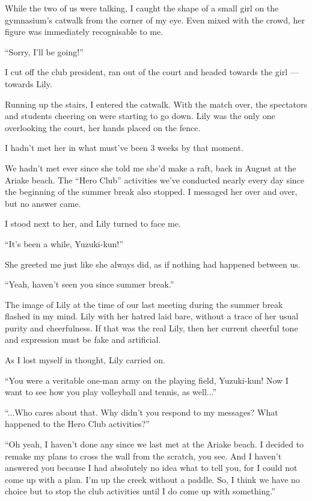 While the two of us were talking, I caught the shape of a small girl on the gymnasium's catwalk from the corner of my eye. Even mixed with the crowd, her figure was immediately recognisable to me.

``Sorry, I'll be going!''

I cut off the club president, ran out of the court and headed towards the girl --- towards Lily.

Running up the stairs, I entered the catwalk. With the match over, the spectators and students cheering on were starting to go down. Lily was the only one overlooking the court, her hands placed on the fence.

I hadn't met her in what must've been 3 weeks by that moment.

We hadn't met ever since she told me she'd make a raft, back in August at the Ariake beach. The ``Hero Club'' activities we've conducted nearly every day since the beginning of the summer break also stopped. I messaged her over and over, but no answer came.

I stood next to her, and Lily turned to face me.

``It's been a while, Yuzuki-kun!''

She greeted me just like she always did, as if nothing had happened between us.

``Yeah, haven't seen you since summer break.''

The image of Lily at the time of our last meeting during the summer break flashed in my mind. Lily with her hatred laid bare, without a trace of her usual purity and cheerfulness. If that was the real Lily, then her current cheerful tone and expression must be fake and artificial.

As I lost myself in thought, Lily carried on.

``You were a veritable one-man army on the playing field, Yuzuki-kun! Now I want to see how you play volleyball and tennis, as well...''

``...Who cares about that. Why didn't you respond to my messages? What happened to the Hero Club activities?''

``Oh yeah, I haven't done any since we last met at the Ariake beach. I decided to remake my plans to cross the wall from the scratch, you see. And I haven't answered you because I had absolutely no idea what to tell you, for I could not come up with a plan. I'm up the creek without a paddle. So, I think we have no choice but to stop the club activities until I do come up with something.''

